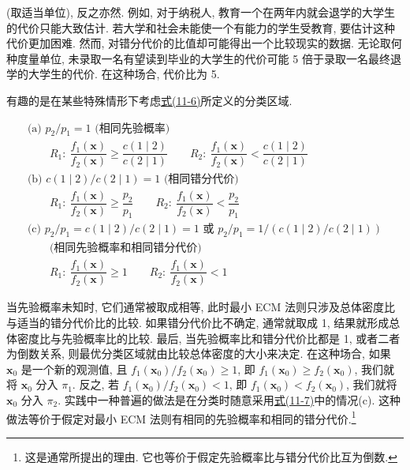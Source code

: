 
(取适当单位), 反之亦然. 例如, 对于纳税人, 教育一个在两年内就会退学的大学生的代价只能大致估计. 若大学和社会未能使一个有能力的学生受教育, 要估计这种代价更加困难. 然而, 对错分代价的比值却可能得出一个比较现实的数据. 无论取何种度量单位, 未录取一名有望读到毕业的大学生的代价可能 5 倍于录取一名最终退学的大学生的代价. 在这种场合, 代价比为 5.

有趣的是在某些特殊情形下考虑\hyperref[eq:11-6]{式(11-6)}所定义的分类区域.

\begin{mvframe}[最小期望代价域的几个特例]
\label{eq:11-7}
\begin{equation}
\begin{array}{l}
\text{(a) } p_2/p_1=1 \text{ (相同先验概率)}\\[4pt]
\qquad R_1:\ \dfrac{f_1(\mathbf{x})}{f_2(\mathbf{x})}\geqslant\dfrac{c(1\mid2)}{c(2\mid1)} \qquad R_2:\ \dfrac{f_1(\mathbf{x})}{f_2(\mathbf{x})}<\dfrac{c(1\mid2)}{c(2\mid1)}\\[8pt]
\text{(b) } c(1\mid2)/c(2\mid1)=1 \text{ (相同错分代价)}\\[4pt]
\qquad R_1:\ \dfrac{f_1(\mathbf{x})}{f_2(\mathbf{x})}\geqslant\dfrac{p_2}{p_1} \qquad R_2:\ \dfrac{f_1(\mathbf{x})}{f_2(\mathbf{x})}<\dfrac{p_2}{p_1}\\[8pt]
\text{(c) } p_2/p_1=c(1\mid2)/c(2\mid1)=1 \text{ 或 } p_2/p_1=1/(c(1\mid2)/c(2\mid1))\\
\qquad\text{(相同先验概率和相同错分代价)}\\[4pt]
\qquad R_1:\ \dfrac{f_1(\mathbf{x})}{f_2(\mathbf{x})}\geqslant 1 \qquad R_2:\ \dfrac{f_1(\mathbf{x})}{f_2(\mathbf{x})}<1
\end{array}
\tag{11-7}
\end{equation}
\end{mvframe}

当先验概率未知时, 它们通常被取成相等, 此时最小 ECM 法则只涉及总体密度比与适当的错分代价比的比较. 如果错分代价比不确定, 通常就取成 1, 结果就形成总体密度比与先验概率比的比较. 最后, 当先验概率比和错分代价比都是 1, 或者二者为倒数关系, 则最优分类区域就由比较总体密度的大小来决定. 在这种场合, 如果 $\mathbf{x}_0$ 是一个新的观测值, 且 $f_1(\mathbf{x}_0)/f_2(\mathbf{x}_0)\geqslant 1$, 即 $f_1(\mathbf{x}_0)\geqslant f_2(\mathbf{x}_0)$, 我们就将 $\mathbf{x}_0$ 分入 $\pi_1$. 反之, 若 $f_1(\mathbf{x}_0)/f_2(\mathbf{x}_0)<1$, 即 $f_1(\mathbf{x}_0)<f_2(\mathbf{x}_0)$, 我们就将 $\mathbf{x}_0$ 分入 $\pi_2$. 实践中一种普遍的做法是在分类时随意采用\hyperref[eq:11-7]{式(11-7)}中的情况(c). 这种做法等价于假定对最小 ECM 法则有相同的先验概率和相同的错分代价.\footnote{这是通常所提出的理由. 它也等价于假定先验概率比与错分代价比互为倒数.}

